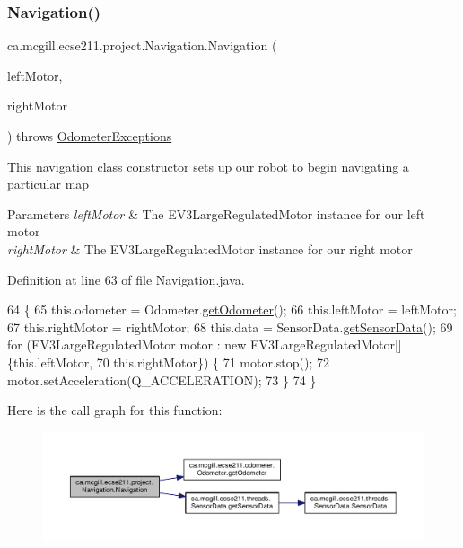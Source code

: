\subsubsection{\texorpdfstring{Navigation()}{Navigation()}}
{\footnotesize\ttfamily ca.\+mcgill.\+ecse211.\+project.\+Navigation.\+Navigation (\begin{DoxyParamCaption}\item[{E\+V3\+Large\+Regulated\+Motor}]{left\+Motor,  }\item[{E\+V3\+Large\+Regulated\+Motor}]{right\+Motor }\end{DoxyParamCaption}) throws \hyperlink{classca_1_1mcgill_1_1ecse211_1_1odometer_1_1_odometer_exceptions}{Odometer\+Exceptions}}

This navigation class constructor sets up our robot to begin navigating a particular map


\begin{DoxyParams}{Parameters}
{\em left\+Motor} & The E\+V3\+Large\+Regulated\+Motor instance for our left motor \\
\hline
{\em right\+Motor} & The E\+V3\+Large\+Regulated\+Motor instance for our right motor \\
\hline
\end{DoxyParams}


Definition at line 63 of file Navigation.\+java.


\begin{DoxyCode}
64                                 \{
65     this.odometer = Odometer.\hyperlink{classca_1_1mcgill_1_1ecse211_1_1odometer_1_1_odometer_a99171f11e34dea918fa9dd069d721439}{getOdometer}();
66     this.leftMotor = leftMotor;
67     this.rightMotor = rightMotor;
68     this.data = SensorData.\hyperlink{classca_1_1mcgill_1_1ecse211_1_1threads_1_1_sensor_data_a8260aba53b4474ca1275e4ce26157977}{getSensorData}();
69     \textcolor{keywordflow}{for} (EV3LargeRegulatedMotor motor : \textcolor{keyword}{new} EV3LargeRegulatedMotor[] \{this.leftMotor,
70         this.rightMotor\}) \{
71       motor.stop();
72       motor.setAcceleration(Q\_ACCELERATION);
73     \}
74   \}
\end{DoxyCode}
Here is the call graph for this function\+:\nopagebreak
\begin{figure}[H]
\begin{center}
\leavevmode
\includegraphics[width=350pt]{classca_1_1mcgill_1_1ecse211_1_1project_1_1_navigation_aaee14b67c392ddd951e3ce21224c3e56_cgraph}
\end{center}
\end{figure}


